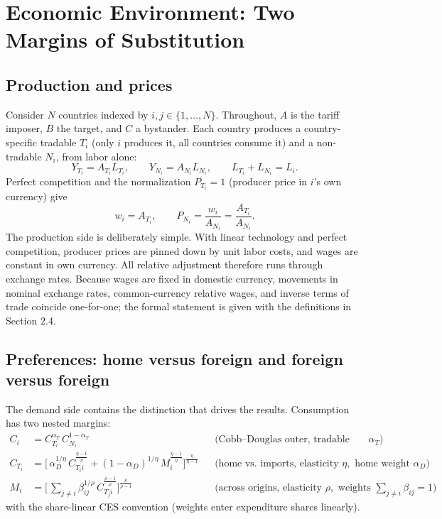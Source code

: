 \documentclass[11pt]{article}
\begin{document}
\section{Economic Environment: Two Margins of Substitution}

\subsection{Production and prices}

Consider $N$ countries indexed by $i, j \in \{1, \dots, N\}$. Throughout, $A$ is the tariff imposer, $B$ the target, and $C$ a bystander. Each country produces a country-specific tradable $T_i$ (only $i$ produces it, all countries consume it) and a non-tradable $N_i$, from labor alone:
\begin{equation}
Y_{T_i} = A_{T_i} L_{T_i}, \qquad Y_{N_i} = A_{N_i} L_{N_i}, \qquad L_{T_i} + L_{N_i} = L_i .
\end{equation}
Perfect competition and the normalization $P_{T_i} = 1$ (producer price in $i$'s own currency) give
\begin{equation}
w_i = A_{T_i}, \qquad P_{N_i} = \frac{w_i}{A_{N_i}} = \frac{A_{T_i}}{A_{N_i}} .
\label{eq:wage}
\end{equation}
The production side is deliberately simple. With linear technology and perfect competition, producer prices are pinned down by unit labor costs, and wages are constant in own currency. All relative adjustment therefore runs through exchange rates. Because wages are fixed in domestic currency, movements in nominal exchange rates, common-currency relative wages, and inverse terms of trade coincide one-for-one; the formal statement is given with the definitions in Section 2.4.

\subsection{Preferences: home versus foreign and foreign versus foreign}

The demand side contains the distinction that drives the results. Consumption has two nested margins:
\begin{align}
C_i &= C_{T_i}^{\alpha_T}\, C_{N_i}^{1-\alpha_T}
&& \text{(Cobb--Douglas outer, tradable share } \alpha_T)
\label{eq:outer}\\[2pt]
C_{T_i} &= \Big[\, \alpha_D^{1/\eta}\, C_{T_i i}^{\frac{\eta-1}{\eta}}
+ (1-\alpha_D)^{1/\eta}\, M_i^{\frac{\eta-1}{\eta}} \Big]^{\frac{\eta}{\eta-1}}
&& \text{(home vs.\ imports, elasticity } \eta, \text{ home weight } \alpha_D)
\label{eq:mid}\\[2pt]
M_i &= \Big[\, \textstyle\sum_{j \neq i} \beta_{ij}^{1/\rho}\, C_{T_j i}^{\frac{\rho-1}{\rho}} \Big]^{\frac{\rho}{\rho-1}}
&& \text{(across origins, elasticity } \rho, \text{ weights } \textstyle\sum_{j\neq i}\beta_{ij}=1)
\label{eq:inner}
\end{align}
with the share-linear CES convention (weights enter expenditure shares linearly).
\end{document}
